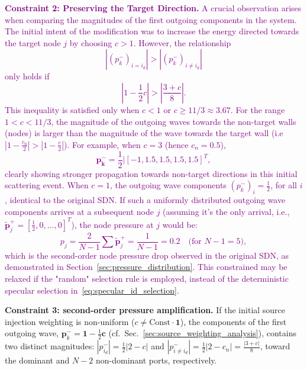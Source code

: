 \documentclass[journal]{IEEEtran}
\begin{document}
\textcolor{purple}{
\textbf{Constraint 2: Preserving the Target Direction.}
A crucial observation arises when comparing the magnitudes of the first outgoing components in the system. The initial intent of the modification was to increase the energy directed towards the target node $j$ by choosing $c>1$. However, the relationship
\begin{equation}
\label{C2_eqn}
|\left(p_{k}^{-}\right)_{i=i_d}| > |\left(p_{k}^{-}\right)_{i\neq i_d}|
\end{equation}
only holds if 
\begin{equation}
\label{C1}
|1-\frac{1}{2}c| > \left|\frac{3 + c}{8}\right|.
\end{equation}
This inequality is satisfied only when $c<1$ or $c\geq 11/3 \approx 3.67$.
For the range $1<c<11/3$, the magnitude of the outgoing waves towards the non-target walls (nodes) is larger than the magnitude of the wave towards the target wall (i.e $ |1-\frac{c_{\text{n}}}{2}| >|1-\frac{c}{2}|$). For example, when $c=3$ (hence $c_n=0.5$),
\begin{equation}
\label{ex:target_gets_smaller_p}
\mathbf{p_{k}^{-}} = \frac{1}{2}|[-1, 1.5, 1.5, 1.5, 1.5]^{T},
\end{equation}
clearly showing stronger propagation towards non-target directions in this initial scattering event. 
When \( c = 1 \), the outgoing wave components \( (p_k^-)_i = \frac{1}{2} \), for all $i$, identical to the original SDN. If such a uniformly distributed outgoing wave components arrives at a subsequent node \( j \) (assuming it's the only arrival, i.e., \( \mathbf{\tilde p}_j^+ = [\frac{1}{2}, 0, \ldots, 0]^T \)), the node pressure at \( j \) would be:
\begin{equation}
    p_j = \frac{2}{N-1} \sum \mathbf {\tilde p}_j^+ = \frac{1}{N-1} = 0.2 \quad \text{(for } N - 1 = 5\text{)},
\end{equation}
which is the second-order node pressure drop observed in the original SDN, as demonstrated in Section~\ref{sec:pressure_distribution}. This constrained may be relaxed if the "random" selection rule is employed, instead of the deterministic specular selection in~\eqref{eq:specular_id_selection}.}

\textbf{Constraint 3: second-order pressure amplification.} If the initial source injection weighting is non-uniform (\( c \neq \text{Const} \cdot \mathbf{1} \)), the components of the first outgoing wave,
\(\mathbf p_k^-=\mathbf 1-\tfrac12\mathbf c\) (cf.\ Sec.~\ref{sec:source_weighting_analysis}), contains two distinct magnitudes: 
\( |p^-_{i_d}|=\tfrac12|2-c| \) and \( |p^-_{i\neq i_d}|=\tfrac12|2-c_n|=\tfrac{|3 + c|}{8} \), toward the dominant and $N-2$ non-dominant ports, respectively.
\end{document}
